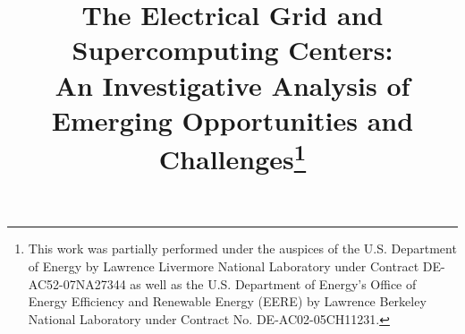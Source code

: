 \documentclass{../style/sig-alternate}
\begin{document}
%

\title{
The Electrical Grid and Supercomputing Centers:\\
An Investigative Analysis of Emerging Opportunities and Challenges\thanks{This work was partially performed under the auspices of the U.S. Department of Energy by Lawrence Livermore National Laboratory under Contract DE-AC52-07NA27344 as well as the U.S. Department of Energy's Office of Energy Efficiency and Renewable Energy (EERE) by Lawrence Berkeley National Laboratory under Contract No. DE-AC02-05CH11231.}
}

%
%

\maketitle              %

\end{document}
